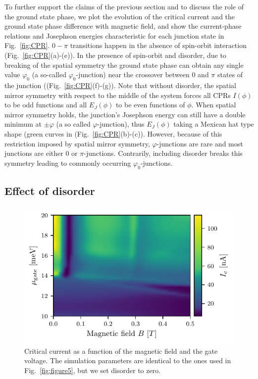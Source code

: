 To further support the claims of the previous section and to discuss the role of the ground state phase, we plot the evolution of the critical current and the ground state phase difference with magnetic field, and show the current-phase relations and Josephson energies characteristic for each junction state in Fig.~\ref{fig:CPR}.
$0-\pi$ transitions happen in the absence of spin-orbit interaction (Fig.~\ref{fig:CPR}(a)-(e)).
In the presence of spin-orbit and disorder, due to breaking of the spatial symmetry the ground state phase can obtain any single value $\varphi_0$ (a so-called $\varphi_0$-junction) near the crossover between $0$ and $\pi$ states of the junction ((Fig.~\ref{fig:CPR}(f)-(g)).
Note that without disorder, the spatial mirror symmetry with respect to the middle of the system forces all CPRs $I(\phi)$ to be odd functions and all $E_J(\phi)$ to be even functions of $\phi$.
When spatial mirror symmetry holds, the junction's Josephson energy can still have a double minimum at $\pm\varphi$ (a so called $\varphi$-junction), thus $E_J(\phi)$ taking a Mexican hat type shape (green curves in (Fig.~\ref{fig:CPR}(b)-(c)).
However, because of this restriction imposed by spatial mirror symmetry, $\varphi$-junctions are rare and most junctions are either 0 or $\pi$-junctions.
Contrarily, including disorder breaks this symmetry leading to commonly occurring $\varphi_0$-junctions.

\subsection{Effect of disorder}

\begin{figure}
\begin{center}
\includegraphics[width=0.7\columnwidth]{chapter_supercurrent/figures/sup_fig9.pdf}
\caption{Critical current as a function of the magnetic field and the gate voltage.
The simulation parameters are identical to the ones used in Fig.~\ref{fig:figure5}, but we set disorder to zero.\label{fig:gate_dependence}}
\end{center}
\end{figure}

